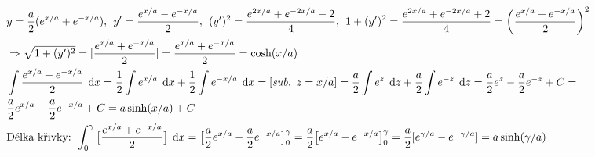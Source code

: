 \documentclass[a4paper]{article}
\newcommand{\dx}{\hspace{0.15cm}\text{d}x}
\newcommand{\dz}{\hspace{0.15cm}\text{d}z}
\begin{document}
\section{}
\begin{align*}
	& y = \frac{a}{2}(e^{x/a} + e^{-x/a}), \hspace{0.15cm} y' = \frac{e^{x/a} - e^{-x/a}}{2}, \hspace{0.15cm} (y')^2 = \frac{e^{2x/a} + e^{-2x/a}-2}{4}, \hspace{0.15cm} 1+(y')^2 = \frac{e^{2x/a} + e^{-2x/a}+2}{4} = \bigg( \frac{e^{x/a} + e^{-x/a}}{2}\bigg)^2 \\
	& \Rightarrow \sqrt{1+(y')^2} = |\frac{e^{x/a} + e^{-x/a}}{2}| = \frac{e^{x/a} + e^{-x/a}}{2} = \cosh(x/a) \\
	& \int \frac{e^{x/a} + e^{-x/a}}{2} \dx = \frac{1}{2} \int e^{x/a} \dx + \frac{1}{2} \int e^{-x/a} \dx =  [\textit{sub. $z=x/a$}] = \frac{a}{2} \int e^{z} \dz + \frac{a}{2} \int e^{-z} \dz = \frac{a}{2} e^{z} - \frac{a}{2} e^{-z} + C =  \\
	& \frac{a}{2} e^{x/a} - \frac{a}{2} e^{-x/a} + C =  a \sinh(x/a) + C \\
	& \text{Délka křivky: } \int_0^\gamma \big[ \frac{e^{x/a} + e^{-x/a}}{2} \big] \dx = \big[ \frac{a}{2} e^{x/a} - \frac{a}{2} e^{-x/a} \big]_0^\gamma = \frac{a}{2}  \big[ e^{x/a} - e^{-x/a} \big]_0^\gamma = \frac{a}{2} [ e^{\gamma/a} - e^{-\gamma/a} ] = a \sinh(\gamma/a)
\end{align*}

\pagebreak
\end{document}
